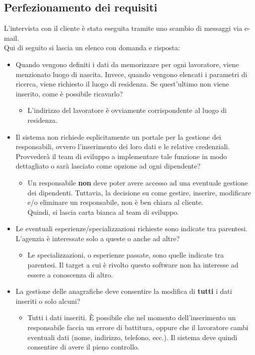 \documentclass[a4paper,11pt]{article}
\begin{document}
\subsection{Perfezionamento dei requisiti}
L'intervista con il cliente è stata eseguita tramite uno scambio di messaggi via e-mail.\\
Qui di seguito si lascia un elenco con domanda e risposta:
\begin{itemize}
	\item[\ding{45}] Quando vengono definiti i dati da memorizzare per ogni lavoratore, viene menzionato luogo di nascita. Invece, quando vengono elencati i parametri di ricerca, viene richiesto il luogo di residenza. Se quest'ultimo non viene inserito, come è possibile ricavarlo?
	\begin{itemize}
		\item[\ding{42}] L’indirizzo del lavoratore è ovviamente corrispondente al luogo di residenza.
	\end{itemize}

	\item[\ding{45}] Il sistema non richiede esplicitamente un portale per la gestione dei responsabili, ovvero l'inserimento dei loro dati e le relative credenziali. Provvederà il team di sviluppo a implementare tale funzione in modo dettagliato o sarà lasciato come opzione ad ogni dipendente?
	\begin{itemize}
		\item[\ding{42}] Un responsabile \textbf{non} deve poter avere accesso ad una eventuale gestione dei dipendenti. Tuttavia, la decisione su come gestire, inserire, modificare e/o eliminare un responsabile, non è ben chiara al cliente.\\
		Quindi, si lascia carta bianca al team di sviluppo.
	\end{itemize}
	
	\item[\ding{45}] Le eventuali esperienze/specializzazioni richieste sono indicate tra parentesi. L'agenzia è interessate solo a queste o anche ad altre?
	\begin{itemize}
		\item[\ding{42}] Le specializzazioni, o esperienze passate, sono quelle indicate tra parentesi. Il target a cui è rivolto questo software non ha interesse ad essere a conoscenza di altro.
	\end{itemize}

	\item[\ding{45}] La gestione delle anagrafiche deve consentire la modifica di \textbf{tutti} i dati inseriti o solo alcuni?
	\begin{itemize}
		\item[\ding{42}] Tutti i dati inseriti. È possibile che nel momento dell'inserimento un responsabile faccia un errore di battitura, oppure che il lavoratore cambi eventuali dati (nome, indirizzo, telefono, ecc.). Il sistema deve quindi consentire di avere il pieno controllo.
	\end{itemize}
\end{itemize}
\end{document}
